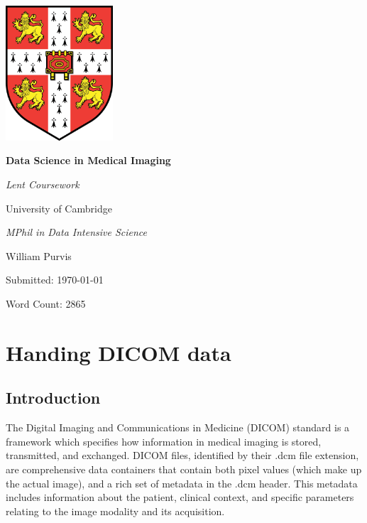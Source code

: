 \documentclass[12pt]{report}
\begin{document}
\begin{titlepage}
    \centering
    \includegraphics[width=0.3\textwidth]{crest.png}\par\vspace{1cm}
    {\Huge\bfseries Data Science in Medical Imaging\par}
    {\Huge\textit {Lent Coursework}\par}
    \vspace{1cm}
    {\Large University of Cambridge\par}
    {\Large\textit{MPhil in Data Intensive Science}\par}
    \vspace{1cm}
    {\Large William Purvis\par}
    {\small Submitted: \today\par}
    {\small Word Count: 2865\par}
\end{titlepage}

\tableofcontents

\chapter{Handing DICOM data}
\section{Introduction}

The Digital Imaging and Communications in Medicine (DICOM) standard is a framework which specifies how information in medical imaging is stored, transmitted, and exchanged. \cite{noauthor_ps31_nodate, bidgood_understanding_1997} DICOM files, identified by their .dcm file extension, are comprehensive data containers that contain both pixel values (which make up the actual image), and a rich set of metadata in the .dcm header. This metadata includes information about the patient, clinical context, and specific parameters relating to the image modality and its acquisition.
\end{document}
